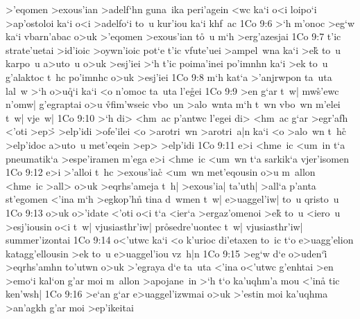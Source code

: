 >'eqomen
>exous'ian
>adelf`hn
guna~ika
peri'agein
<wc
ka`i
o<i
loipo`i
>ap'ostoloi
ka`i
o<i
>adelfo`i
to~u
kur'iou
ka`i
khf~ac\bibvsend
\vs 1Co 9:6
>`h
m'onoc
>eg`w
ka`i
vbarn'abac
o>uk
>'eqomen
>exous'ian
t\r{o}~u
m`h
>erg'azesjai\bibvsend
\vs 1Co 9:7
t'ic
strate'uetai
>id'ioic
>oywn'ioic
pot`e
t'ic
vfute'uei
>ampel~wna
ka`i
>ek\r{}
to~u
karpo~u
a>uto~u
o>uk
>esj'iei
>`h
t'ic
poima'inei
po'imnhn
ka`i
>ek
to~u
g'alaktoc
t~hc
po'imnhc
o>uk
>esj'iei\bibvsend
\vs 1Co 9:8
m`h
kat`a
>'anjrwpon
ta~uta
lal~w
>`h
o>u\r{q}`i
ka`i
<o
n'omoc
ta~uta
l'e\r{g}ei\bibvsend
{}
\vs 1Co 9:9
>en
g`ar
t~w|
mw\r{s}'ewc
n'omw|
g'egraptai
o>u
\r{vf}im'wseic
vbo~un
>alo~wnta
m`h
t~wn
vbo~wn
m'elei
t~w|
vje~w|\bibvsend
\vs 1Co 9:10
>`h
di>
<hm~ac
p'antwc
l'egei
di>
<hm~ac
g`ar
>egr'afh
<'oti
>ep>\r{}
>elp'idi
>ofe'ilei
<o
>arotri~wn
>arotri~a|n
ka`i
<o
>alo~wn
t~hc\r{}
>elp'idoc
a>uto~u
met'eqein
>ep>
>elp'idi\bibvsend
\vs 1Co 9:11
e>i
<hme~ic
<um~in
t`a
pneumatik`a
>espe'iramen
m'ega
e>i
<hme~ic
<um~wn
t`a
sarkik`a
vjer'isomen\bibvsend
\vs 1Co 9:12
e>i
>'alloi
t~hc
>exous'iac\r{}
<um~wn
met'eqousin
o>u
m~allon
<hme~ic
>all>
o>uk
>eqrhs'ameja
t~h|
>exous'ia|
ta'uth|
>all`a
p'anta
st'egomen
<'ina
m`h
>egkop'hn\r{}
tina
d~wmen
t~w|
e>uaggel'iw|
to~u
qristo~u\bibvsend
\vs 1Co 9:13
o>uk
o>'idate
<'oti
o<i
t`a
<ier`a
>ergaz'omenoi
>e\r{k}
to~u
<iero~u
>esj'iousin
o<i
t~w|
vjusiasthr'iw|
pr\r{o}sedre'uontec
t~w|
vjusiasthr'iw|
summer'izontai\bibvsend
\vs 1Co 9:14
o<'utwc
ka`i
<o
k'urioc
di'etaxen
to~ic
t`o
e>uagg'elion
katagg'ellousin
>ek
to~u
e>uaggel'iou
vz~h|n\bibvsend
\vs 1Co 9:15
>eg`w
d`e
o>uden`i\r{}
>eqrhs'amhn
to'utwn
o>uk
>'egraya
d`e
ta~uta
<'ina
o<'utwc
g'enhtai
>en
>emo`i
kal`on
g'ar
moi
m~allon
>apojane~in
>`h
t`o
ka'uqhm'a
mou
<'ina\r{}
tic
ken'wsh|\bibvsend
\vs 1Co 9:16
>e`an
g`ar
e>uaggel'izwmai
o>uk
>'estin
moi
ka'uqhma
>an'agkh
g'ar
moi
>ep'ikeitai
